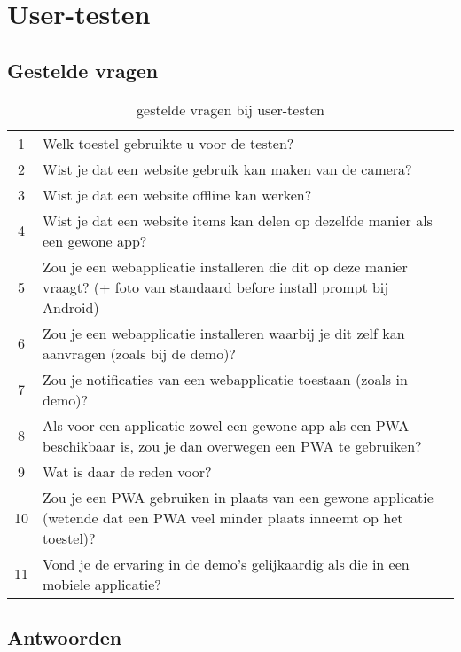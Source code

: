 \chapter{User-testen }
\label{ch:userTesten}

\section{Gestelde vragen}

\begin{table}[H]
	\centering
	\begin{tabular}{cp{12cm}}
		1 &  Welk toestel gebruikte u voor de testen? \\
		2 &  Wist je dat een website gebruik kan maken van de camera? \\
		3 &  Wist je dat een website offline kan werken? \\
		4 &  Wist je dat een website items kan delen op dezelfde manier als een gewone app?\\
		5 &  Zou je een webapplicatie installeren die dit op deze manier vraagt?  (+ foto van standaard before install prompt bij Android) \\
		6 &  Zou je een webapplicatie installeren waarbij je dit zelf kan aanvragen (zoals bij de demo)? \\
		7 &  Zou je notificaties van een webapplicatie toestaan (zoals in demo)? \\
		8 &  Als voor een applicatie zowel een gewone app als een PWA beschikbaar is, zou je dan overwegen een PWA te gebruiken? \\
		9 &  Wat is daar de reden voor?  \\
		10 &  Zou je een PWA gebruiken in plaats van een gewone applicatie (wetende dat een PWA veel minder plaats inneemt op het toestel)? \\
		11 &  Vond je de ervaring in de demo's gelijkaardig als die in een mobiele applicatie? \\
	\end{tabular}	
	\caption{gestelde vragen bij user-testen}
\end{table}

\section{Antwoorden}

